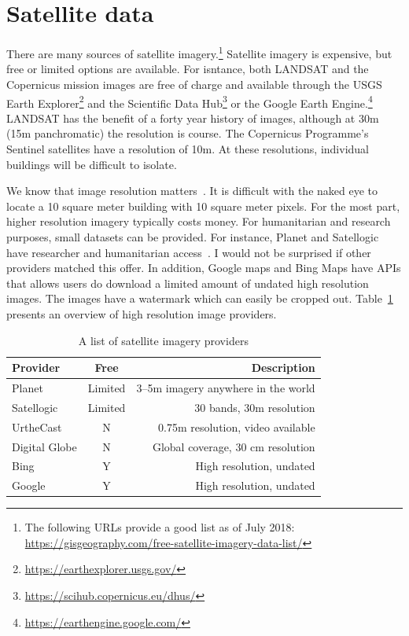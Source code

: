 \documentclass[12pt, a4paper, oneside, headinclude, footinclude]{article}
\begin{document}
\section{Satellite data}

There are many sources of satellite imagery.\footnote{The following URLs
provide a good list as of July 2018:
\url{https://gisgeography.com/free-satellite-imagery-data-list/}}
Satellite imagery is expensive, but free or limited options are available. For
isntance, both LANDSAT and the Copernicus mission images are free of charge and
available through the USGS Earth
Explorer\footnote{\url{https://earthexplorer.usgs.gov/}} and the Scientific
Data Hub\footnote{\url{https://scihub.copernicus.eu/dhus/}} or the
Google Earth Engine.\footnote{\url{https://earthengine.google.com/}} LANDSAT
has the benefit of a forty year history of images, although at 30m (15m
panchromatic) the resolution is course. The Copernicus Programme's Sentinel
satellites have a resolution of 10m. At these resolutions, individual
buildings will be difficult to isolate.

We know that image resolution matters~\cite{2017The}. It is difficult with the
naked eye to locate a 10 square meter building with 10 square meter pixels.
For the most part, higher resolution imagery typically costs money. For
humanitarian and research purposes, small datasets can be provided. For
instance, Planet and Satellogic have researcher and humanitarian
access~\cite{Planet,Satellogic}. I would not be surprised if other providers
matched this offer. In addition, Google maps and Bing Maps have APIs that
allows users do download a limited amount of  undated high resolution images.
The images have a watermark which can easily be cropped out.
Table~\ref{tab:meinetabelle} presents an overview of high resolution image
providers.

\begin{table}[htb]
\caption{A list of satellite imagery providers}
\begin{tabular}{lcr}
Provider & Free & Description \\
\hline
    Planet & Limited & 3--5m imagery anywhere in the world \\
    Satellogic & Limited & 30 bands, 30m resolution \\
    UrtheCast & N & 0.75m resolution, video available \\    
    Digital Globe & N & Global coverage, 30 cm resolution \\ 
    Bing & Y & High resolution, undated \\
    Google & Y & High resolution, undated \\
\end{tabular} 
\label{tab:meinetabelle}
\end{table}
\end{document}
